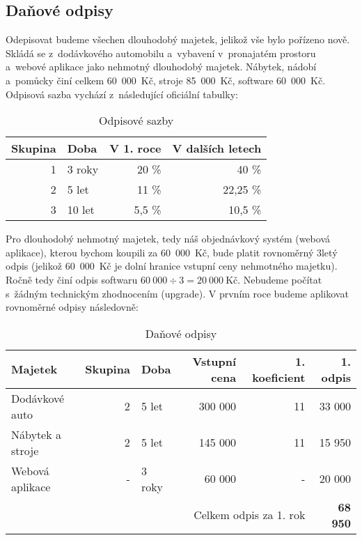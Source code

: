 \subsection{Daňové odpisy}
Odepisovat budeme všechen dlouhodobý majetek, jelikož vše bylo pořízeno nově. Skládá se z~dodávkového automobilu a~vybavení v~pronajatém prostoru a~webové aplikace jako nehmotný dlouhodobý majetek. Nábytek, nádobí a~pomůcky činí celkem 60~000~Kč, stroje 85~000~Kč, software 60~000~Kč. Odpisová sazba vychází z~následující oficiální tabulky:

\begin{table}[htbp]
\begin{center}
\begin{tabular}{ r l r r }
\textbf{Skupina} & \textbf{Doba} & \textbf{V 1. roce} & \textbf{V dalších letech} \\ \hline
1                & 3 roky        & 20 \%              & 40 \%                     \\ 
2                & 5 let         & 11 \%              & 22,25 \%                  \\
3                & 10 let        & 5,5 \%             & 10,5 \%                    
\end{tabular}
\caption{Odpisové sazby}
\label{odpisove_sazby}
\end{center}
\end{table}

Pro dlouhodobý nehmotný majetek, tedy náš objednávkový systém (webová aplikace), kterou bychom koupili za 60~000~Kč, bude platit rovnoměrný 3letý odpis (jelikož 60~000~Kč je dolní hranice vstupní ceny nehmotného majetku). Ročně tedy činí odpis softwaru $60~000 \div 3 = 20~000~\text{Kč}$. Nebudeme počítat s~žádným technickým zhodnocením (upgrade). V prvním roce budeme aplikovat rovnoměrné odpisy následovně:

\begin{table}[htbp]
\begin{center}
\begin{tabular}{lrlrrr}
\textbf{Majetek} & \textbf{Skupina}     & \textbf{Doba} & \textbf{Vstupní cena} & \textbf{1. koeficient}               & \textbf{1. odpis} \\ \hline
Dodávkové auto   & 2                    & 5 let         & 300 000               & 11                                   & 33 000            \\
Nábytek a stroje & 2                    & 5 let         & 145 000               & 11                                   & 15 950            \\
Webová aplikace  & -                    & 3 roky        & 60 000                & -                                    & 20 000            \\ \hline
                 & \multicolumn{1}{l}{} &               & \multicolumn{2}{r}{Celkem odpis za 1. rok} & \textbf{68 950}           
\end{tabular}
\caption{Daňové odpisy}
\label{danove_odpisy}
\end{center}
\end{table}

